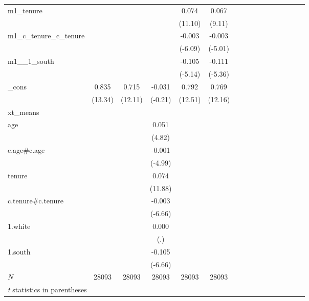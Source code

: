 \documentclass[bib]{statapress}
\begin{document}
\begin{table}[H]
{\begin{tabular}{l*{5}{c}cccccccccc}
m1\_tenure   &            &            &            &       0.074&       0.067\\
            &            &            &            &     (11.10)&      (9.11)\\
m1\_c\_tenure\_c\_tenure&            &            &            &      -0.003&      -0.003\\
            &            &            &            &     (-6.09)&     (-5.01)\\
m1\_\_1\_south &            &            &            &      -0.105&      -0.111\\
            &            &            &            &     (-5.14)&     (-5.36)\\
\_cons      &       0.835&       0.715&      -0.031&       0.792&       0.769\\
            &     (13.34)&     (12.11)&     (-0.21)&     (12.51)&     (12.16)\\
\hline
xt\_means    &            &            &            &            &            \\
age         &            &            &       0.051&            &            \\
            &            &            &      (4.82)&            &            \\
c.age\#c.age &            &            &      -0.001&            &            \\
            &            &            &     (-4.99)&            &            \\
tenure      &            &            &       0.074&            &            \\
            &            &            &     (11.88)&            &            \\
c.tenure\#c.tenure&            &            &      -0.003&            &            \\
            &            &            &     (-6.66)&            &            \\
1.white     &            &            &       0.000&            &            \\
            &            &            &         (.)&            &            \\
1.south     &            &            &      -0.105&            &            \\
            &            &            &     (-6.66)&            &            \\
\hline
\(N\)       &       28093&       28093&       28093&       28093&       28093\\
\hline\hline
\multicolumn{6}{l}{\footnotesize \textit{t} statistics in parentheses}\\
\end{tabular}

}

\end{table}%
\end{document}
